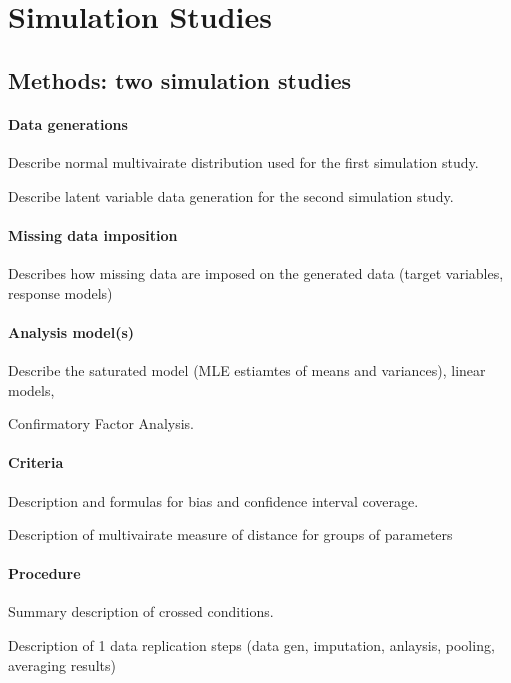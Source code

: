 \maketitle
\section{Simulation Studies}

\subsection{Methods: two simulation studies}

\paragraph{Data generations}
	Describe normal multivairate distribution used for the first simulation study.

	Describe latent variable data generation for the second simulation study.

\paragraph{Missing data imposition}
	Describes how missing data are imposed on the generated data (target variables, response models)

\paragraph{Analysis model(s)}
	Describe the saturated model (MLE estiamtes of means and variances), linear models,

	Confirmatory Factor Analysis.

\paragraph{Criteria}
	Description and formulas for bias and confidence interval coverage.

	Description of multivairate measure of distance for groups of parameters

\paragraph{Procedure}
	Summary description of crossed conditions.

	Description of 1 data replication steps (data gen, imputation, anlaysis, pooling, averaging results)

